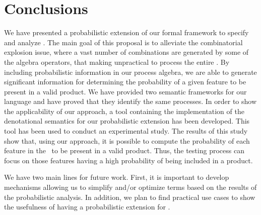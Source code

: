 \section{Conclusions}
\label{section:jstat:concs}

We have presented a probabilistic extension of our
formal framework to specify and analyze \SPLs. The main goal of this
proposal is to alleviate the combinatorial explosion issue, where a vast
number of combinations are generated by some of the algebra operators,
that making unpractical to process the entire \SPL. By including probabilistic information in our process algebra, we are able to generate significant information for determining the probability
of a given feature to be present in a valid product. We have provided two semantic frameworks for our language and have proved that they identify the same processes.
%
In order to show the applicability of our approach, a tool containing the
implementation of the denotational semantics for our probabilistic extension
has been developed. This tool has been used to conduct an experimental study.
%
The results of this study show that, using our approach, it is possible to compute
the probability of each feature in the \SPL\ to be present in a valid product.
Thus, the testing process can focus on those features having a high probability
of being included in a product.



%
%
%
%
We have two main lines for future work. First, it is important to develop
mechanisms allowing us to simplify and/or optimize terms
based on the results of the probabilistic analysis. In addition,
we plan to find practical use cases to show the usefulness of having a probabilistic extension for \SPLs.



